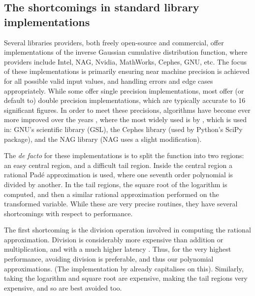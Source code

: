 \documentclass[manuscript,review]{acmart}
\begin{document}
\subsection{The shortcomings in standard library implementations}

Several libraries providers, both freely open-source and commercial, offer implementations of the inverse Gaussian cumulative distribution function, where providers include Intel, NAG, Nvidia, MathWorks, Cephes, GNU, etc. The focus of these implementations is primarily ensuring near machine precision is achieved for all possible valid input values, and handling errors and edge cases appropriately. While some offer single precision implementations, most offer (or default to) double precision implementations, which are typically accurate to 16 significant figures. In order to meet these precisions, algorithms have become ever more improved over the years \citep{hastings1955approximations,evans1974algorithm70,beasley1985percentage,wichura1988algorithm,marsaglia1994rapid,giles2011approximating}, where the most widely used is by \citet{wichura1988algorithm}, which is used in: GNU's scientific library (GSL), the Cephes library (used by Python's SciPy package), and the NAG library (NAG uses a slight modification). 

The \textit{de facto} for these implementations is to split the function into two regions: an easy central region, and a difficult tail region. Inside the central region a rational Pad\'{e} approximation is used, where one seventh order polynomial is divided by another. In the tail regions, the square root of the logarithm is computed, and then a similar rational approximation performed on the transformed variable. While these are very precise routines, they have several shortcomings with respect to performance.

The first shortcoming is the division operation involved in computing the rational approximation. Division is considerably more expensive than addition or multiplication, and with a much higher latency \citep{wittmann2015short,fog2018instruction}. Thus, for the very highest performance, avoiding division is preferable, and thus our polynomial approximations. (The implementation by \citet{giles2011approximating} already capitalises on this). Similarly, taking the logarithm and square root are expensive, making the tail regions very expensive, and so are best avoided too. 
\end{document}
